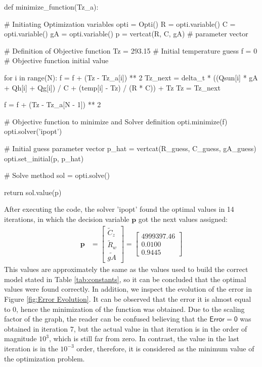 \begin{python}
def minimize_function(Tz_a):
   
    # Initiating Optimization variables
    opti = Opti()
    R = opti.variable()
    C = opti.variable()
    gA = opti.variable()
    p = vertcat(R, C, gA)  # parameter vector

	  # Definition of Objective function
    Tz = 293.15  # Initial temperature guess
    f = 0   # Objective function initial value

    for i in range(N):
        f = f + (Tz - Tz_a[i]) ** 2
        Tz_next = delta_t * ((Qsun[i] * gA + Qh[i] + Qg[i]) / C + (temp[i] - Tz) / (R * C)) + Tz
        Tz = Tz_next
        
    f = f + (Tz - Tz_a[N - 1]) ** 2

	  # Objective function to minimize and Solver definition
    opti.minimize(f)
    opti.solver('ipopt')

    # Initial guess parameter vector
    p_hat = vertcat(R_guess, C_guess, gA_guess)
    opti.set_initial(p, p_hat)

	  # Solve method
    sol = opti.solve()

    return sol.value(p)
\end{python}
\newpage
After executing the code, the solver 'ipopt' found the optimal values in 14 iterations, in which the decision variable $\mathbf{p}$ got the next values assigned: 
\begin{align}
    \mathbf{p} &= \begin{bmatrix}
           \tilde{C}_z\\
           \tilde{R}_w \\
           \tilde{gA} 
         \end{bmatrix} = \begin{bmatrix}
           4999397.46\\
           0.0100\\
           0.9445 
         \end{bmatrix} 
  \end{align}
This values are approximately the same as the values used to build the correct model stated in Table \ref{tab:constants}, so it can be concluded that the optimal values were found correctly. In addition, we inspect the evolution of the error in Figure \ref{fig:Error Evolution}. It can be observed that the error it is almost equal to 0, hence the minimization of the function was obtained. Due to the scaling factor of the graph, the reader can be confused believing that the $\mathsf{Error = 0}$ was obtained in iteration 7, but the actual value in that iteration is in the order of magnitude $10^3$, which is still far from zero. In contrast, the value in the last iteration is in the $10^{-3}$ order, therefore, it is considered as the minimum value of the optimization problem.
